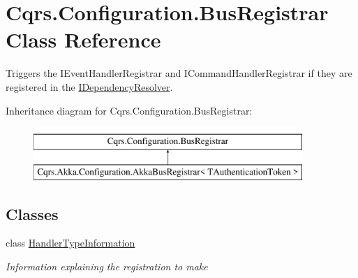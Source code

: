 \hypertarget{classCqrs_1_1Configuration_1_1BusRegistrar}{}\section{Cqrs.\+Configuration.\+Bus\+Registrar Class Reference}
\label{classCqrs_1_1Configuration_1_1BusRegistrar}


Triggers the I\+Event\+Handler\+Registrar and I\+Command\+Handler\+Registrar if they are registered in the \hyperlink{interfaceCqrs_1_1Configuration_1_1IDependencyResolver}{I\+Dependency\+Resolver}.  


Inheritance diagram for Cqrs.\+Configuration.\+Bus\+Registrar\+:\begin{figure}[H]
\begin{center}
\leavevmode
\includegraphics[height=2.000000cm]{classCqrs_1_1Configuration_1_1BusRegistrar}
\end{center}
\end{figure}
\subsection*{Classes}
\begin{DoxyCompactItemize}
\item 
class \hyperlink{classCqrs_1_1Configuration_1_1BusRegistrar_1_1HandlerTypeInformation}{Handler\+Type\+Information}
\begin{DoxyCompactList}\small\item\em Information explaining the registration to make \end{DoxyCompactList}\end{DoxyCompactItemize}
